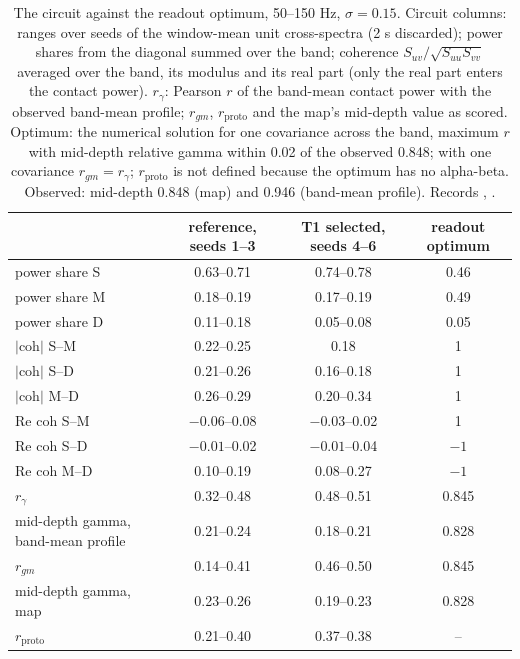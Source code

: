 \begin{table}[tbp]
\centering
\small
\begin{tabular}{lccc}
\toprule
 & reference, seeds 1--3 & T1 selected, seeds 4--6 & readout optimum \\
\midrule
power share S & 0.63--0.71 & 0.74--0.78 & 0.46 \\
power share M & 0.18--0.19 & 0.17--0.19 & 0.49 \\
power share D & 0.11--0.18 & 0.05--0.08 & 0.05 \\
$|$coh$|$ S--M & 0.22--0.25 & 0.18 & 1 \\
$|$coh$|$ S--D & 0.21--0.26 & 0.16--0.18 & 1 \\
$|$coh$|$ M--D & 0.26--0.29 & 0.20--0.34 & 1 \\
Re coh S--M & $-0.06$--0.08 & $-0.03$--0.02 & 1 \\
Re coh S--D & $-0.01$--0.02 & $-0.01$--0.04 & $-1$ \\
Re coh M--D & 0.10--0.19 & 0.08--0.27 & $-1$ \\
$r_\gamma$ & 0.32--0.48 & 0.48--0.51 & 0.845 \\
mid-depth gamma, band-mean profile & 0.21--0.24 & 0.18--0.21 & 0.828 \\
$r_{gm}$ & 0.14--0.41 & 0.46--0.50 & 0.845 \\
mid-depth gamma, map & 0.23--0.26 & 0.19--0.23 & 0.828 \\
$r_\text{proto}$ & 0.21--0.40 & 0.37--0.38 & -- \\
\bottomrule
\end{tabular}
\caption{The circuit against the readout optimum, 50--150 Hz, $\sigma = 0.15$. Circuit columns: ranges over seeds
of the window-mean unit cross-spectra (2 s discarded); power shares from the diagonal summed over the band;
coherence $S_{uv}/\sqrt{S_{uu}S_{vv}}$ averaged over the band, its modulus and its real part (only the real part
enters the contact power). $r_\gamma$: Pearson $r$ of the band-mean contact power with the observed band-mean
profile; $r_{gm}$, $r_\text{proto}$ and the map's mid-depth value as scored. Optimum: the numerical solution for
one covariance across the band, maximum $r$ with mid-depth relative gamma within 0.02 of the observed 0.848; with
one covariance $r_{gm} = r_\gamma$; $r_\text{proto}$ is not defined because the optimum has no alpha-beta.
Observed: mid-depth 0.848 (map) and 0.946 (band-mean profile). Records , .}
\label{tab:circuitopt}
\end{table}

